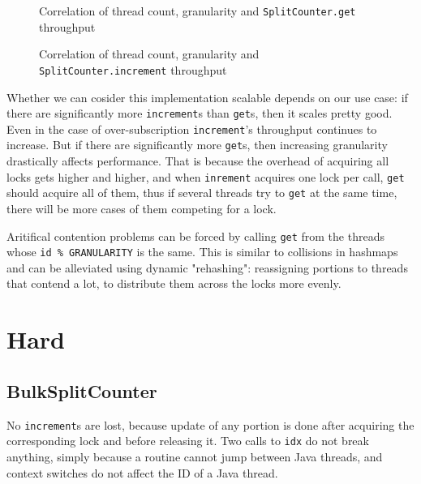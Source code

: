 \documentclass[a4paper,12pt]{article}
\begin{document}
\begin{figure}[!htb]
\begin{center}

\cprotect\caption{Correlation of thread count, granularity and \verb|SplitCounter.get| throughput}
\end{center}
\end{figure}

\begin{figure}[!htb]
\begin{center}

\cprotect\caption{Correlation of thread count, granularity and \verb|SplitCounter.increment| throughput}
\end{center}
\end{figure}

Whether we can cosider this implementation scalable depends on our use case: if there are significantly more \verb|increment|s than \verb|get|s, then it scales pretty good. Even in the case of over-subscription \verb|increment|'s throughput continues to increase. But if there are significantly more \verb|get|s, then increasing granularity drastically affects performance. That is because the overhead of acquiring all locks gets higher and higher, and when \verb|inrement| acquires one lock per call, \verb|get| should acquire all of them, thus if several threads try to \verb|get| at the same time, there will be more cases of them competing for a lock.

Aritifical contention problems can be forced by calling \verb|get| from the threads whose \verb|id % GRANULARITY| is the same. This is similar to collisions in hashmaps and can be alleviated using dynamic "rehashing": reassigning portions to threads that contend a lot, to distribute them across the locks more evenly.

\section*{Hard}

\subsection*{BulkSplitCounter}

No \verb|increment|s are lost, because update of any portion is done after acquiring the corresponding lock and before releasing it. Two calls to \verb|idx| do not break anything, simply because a routine cannot jump between Java threads, and context switches do not affect the ID of a Java thread.
\end{document}
